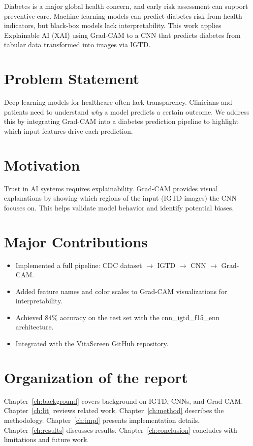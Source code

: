 \documentclass[12pt]{dalthesis}
\begin{document}
Diabetes is a major global health concern, and early risk assessment can support preventive care. Machine learning models can predict diabetes risk from health indicators, but black-box models lack interpretability. This work applies Explainable AI (XAI) using Grad-CAM to a CNN that predicts diabetes from tabular data transformed into images via IGTD.

\section{Problem Statement}

Deep learning models for healthcare often lack transparency. Clinicians and patients need to understand \textit{why} a model predicts a certain outcome. We address this by integrating Grad-CAM into a diabetes prediction pipeline to highlight which input features drive each prediction.

\section{Motivation}

Trust in AI systems requires explainability. Grad-CAM provides visual explanations by showing which regions of the input (IGTD images) the CNN focuses on. This helps validate model behavior and identify potential biases.

\section{Major Contributions}

\begin{itemize}
\item Implemented a full pipeline: CDC dataset $\rightarrow$ IGTD $\rightarrow$ CNN $\rightarrow$ Grad-CAM.
\item Added feature names and color scales to Grad-CAM visualizations for interpretability.
\item Achieved 84\% accuracy on the test set with the cnn\_igtd\_f15\_enn architecture.
\item Integrated with the VitaScreen GitHub repository.
\end{itemize}

\section{Organization of the report}

Chapter~\ref{ch:background} covers background on IGTD, CNNs, and Grad-CAM. Chapter~\ref{ch:lit} reviews related work. Chapter~\ref{ch:method} describes the methodology. Chapter~\ref{ch:impl} presents implementation details. Chapter~\ref{ch:results} discusses results. Chapter~\ref{ch:conclusion} concludes with limitations and future work.
\end{document}

